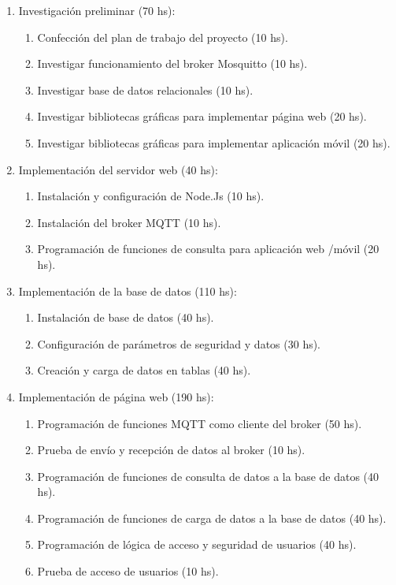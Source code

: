 \documentclass[
11pt, %
]{charter}
\begin{document}
\begin{enumerate}
\item Investigación preliminar (70 hs):
	\begin{enumerate}
	\item Confección del plan de trabajo del proyecto (10 hs).
	\item Investigar funcionamiento del broker Mosquitto (10 hs).
	\item Investigar base de datos relacionales (10 hs).
	\item Investigar bibliotecas gráficas para implementar página web (20 hs).
	\item Investigar bibliotecas gráficas para implementar aplicación móvil (20 hs).
	\end{enumerate}
\item Implementación del servidor web (40 hs):
	\begin{enumerate}
	\item Instalación y configuración de Node.Js (10 hs).
	\item Instalación del broker MQTT (10 hs).
	\item Programación de funciones de consulta para aplicación web /móvil (20 hs).

	\end{enumerate}
\item Implementación de la base de datos (110 hs):
	\begin{enumerate}
	\item Instalación de base de datos (40 hs).
	\item Configuración de parámetros de seguridad y datos (30 hs).
	\item Creación y carga de datos en tablas (40 hs).

	\end{enumerate}
\item Implementación de página web (190 hs):
	\begin{enumerate}
	\item Programación de funciones MQTT como cliente del broker (50 hs).
	\item Prueba de envío y recepción de datos al broker (10 hs).
	\item Programación de funciones de consulta de datos a la base de datos (40 hs).
	\item Programación de funciones de carga de datos a la base de datos (40 hs).
	\item Programación de lógica de acceso y seguridad de usuarios (40 hs).
	\item Prueba de acceso de usuarios (10 hs).
	\end{enumerate}
	

\end{enumerate}
\end{document}
